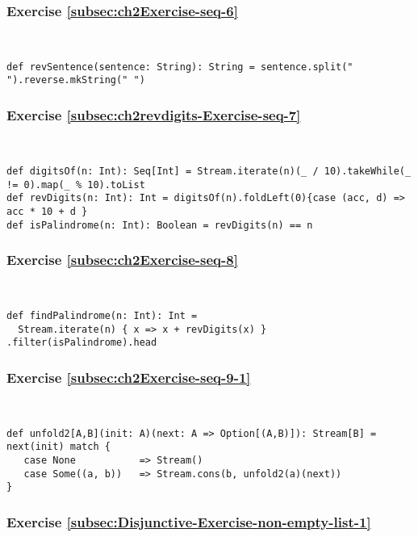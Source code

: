 \subsubsection*{Exercise \ref{subsec:ch2Exercise-seq-6}}

~
\begin{lstlisting}
def revSentence(sentence: String): String = sentence.split(" ").reverse.mkString(" ")
\end{lstlisting}


\subsubsection*{Exercise \ref{subsec:ch2revdigits-Exercise-seq-7}}

~
\begin{lstlisting}
def digitsOf(n: Int): Seq[Int] = Stream.iterate(n)(_ / 10).takeWhile(_ != 0).map(_ % 10).toList
def revDigits(n: Int): Int = digitsOf(n).foldLeft(0){case (acc, d) => acc * 10 + d }
def isPalindrome(n: Int): Boolean = revDigits(n) == n
\end{lstlisting}


\subsubsection*{Exercise \ref{subsec:ch2Exercise-seq-8}}

~
\begin{lstlisting}
def findPalindrome(n: Int): Int = 
  Stream.iterate(n) { x => x + revDigits(x) } .filter(isPalindrome).head
\end{lstlisting}


\subsubsection*{Exercise \ref{subsec:ch2Exercise-seq-9-1}}

~
\begin{lstlisting}
def unfold2[A,B](init: A)(next: A => Option[(A,B)]): Stream[B] = next(init) match {
   case None           => Stream()
   case Some((a, b))   => Stream.cons(b, unfold2(a)(next))
}
\end{lstlisting}



\subsubsection*{Exercise \ref{subsec:Disjunctive-Exercise-non-empty-list-1}}

